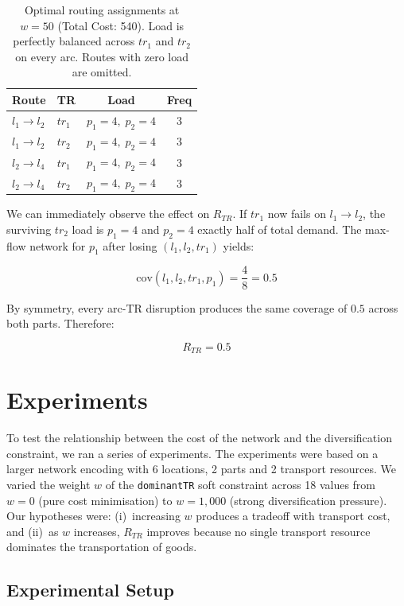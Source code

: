 \documentclass{article}
\begin{document}
\begin{table}[h]
\centering
\begin{tabular}{|l|l|c|c|}
\hline
\textbf{Route} & \textbf{TR} & \textbf{Load} & \textbf{Freq} \\
\hline
$l_1 \to l_2$ & $tr_1$ & $p_1=4,\; p_2=4$ & 3 \\
$l_1 \to l_2$ & $tr_2$ & $p_1=4,\; p_2=4$ & 3 \\
$l_2 \to l_4$ & $tr_1$ & $p_1=4,\; p_2=4$ & 3 \\
$l_2 \to l_4$ & $tr_2$ & $p_1=4,\; p_2=4$ & 3 \\
\hline
\end{tabular}
\caption{Optimal routing assignments at $w=50$ (Total Cost: 540).
Load is perfectly balanced across $tr_1$ and $tr_2$ on every arc.
Routes with zero load are omitted.}
\label{tab:routing-assignments-w50}
\end{table}

We can immediately observe the effect on $R_{TR}$. If $tr_1$ now
fails on $l_1 \to l_2$, the surviving $tr_2$ load is $p_1=4$ and
$p_2=4$ exactly half of total demand. The max-flow network
for $p_1$ after losing $(l_1, l_2, tr_1)$ yields:

\[
    \mathrm{cov}(l_1, l_2, tr_1, p_1) = \frac{4}{8} = 0.5
\]

By symmetry, every arc-TR disruption produces the same coverage
of $0.5$ across both parts. Therefore:

\[
    R_{TR} = 0.5
\]

\section{Experiments}

To test the relationship between the cost of the network and the diversification constraint, we ran a series of experiments. The experiments were based on a larger network encoding with 6 locations, 2 parts and 2 transport resources. We varied the weight $w$ of the \texttt{dominantTR} soft constraint across 18 values from $w=0$ (pure cost minimisation) to $w=1{,}000$ (strong diversification pressure). Our hypotheses were: (i)~increasing $w$ produces a tradeoff with transport cost, and (ii)~as $w$ increases, $R_{TR}$ improves because no single transport resource dominates the transportation of goods.

\subsection{Experimental Setup}
\end{document}
